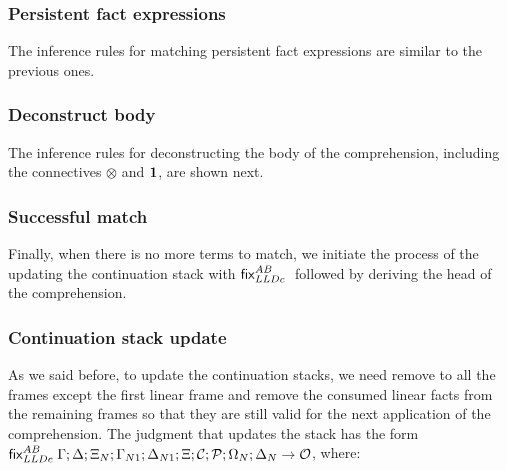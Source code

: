 \subsubsection{Persistent fact expressions}

The inference rules for matching persistent fact expressions are similar to the
previous ones.



\subsubsection{Deconstruct body}

The inference rules for deconstructing the body of the comprehension, including
the connectives $\otimes$ and $\mathbf{1}$, are shown next.



\subsubsection{Successful match}

Finally, when there is no more terms to match, we initiate the process of the
updating the continuation stack with $\mathsf{fix}_{LLDc}^{AB} \;$ followed by deriving the head of the
comprehension.



\subsubsection{Continuation stack update}

As we said before, to update the continuation stacks, we need remove to all the
frames except the first linear frame and remove the consumed linear facts from
the remaining frames so that they are still valid for the next application of
the comprehension.  The judgment that updates the stack has the form $\mathsf{fix}_{LLDc}^{AB} \;
\Gamma; \Delta; \Xi_N; \Gamma_{N1}; \Delta_{N1}; \Xi; \mathcal{C}; \mathcal{P}; \Omega_N; \Delta_N
\rightarrow \mathcal{O}$, where:

